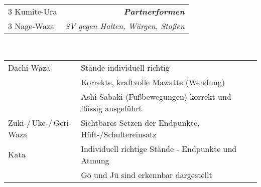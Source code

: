 \begin{tcolorbox}[colframe=BLBELT,colback=white,coltitle=white,title=4. Kyu:\indent Kihon-Ido Kata - Partnerformen - Erwartungshorizont]
\begin{minipage}[t]{0.45\textwidth}
\begin{tabularx}{\textwidth}{cX}
			\midrule
		\end{tabularx}
	\end{minipage}
	\null\hfill\null	%
	\begin{minipage}[t]{0.45\textwidth}
		\begin{tabularx}{\textwidth}{Xr}
			\midrule
			3 Kumite-Ura	&{\textbf{\textit{Partnerformen}}}\\
			3 Nage-Waza		&{\small \textit{SV gegen Halten, Würgen, Stoßen}} \\
			\midrule
		\end{tabularx}
	\end{minipage}\\
	\null\vfill\null
	{\small\begin{tabularx}{\textwidth}{ll}
		\midrule
			Dachi-Waza	&	Stände individuell richtig \\
			&	Korrekte, kraftvolle Mawatte (Wendung)\\
			&	Ashi-Sabaki (Fußbewegungen) korrekt und flüssig ausgeführt\\
			Zuki-/\,Uke-/\,Geri-Waza	&	Sichtbares Setzen der Endpunkte, Hüft-/Schultereinsatz\\
			Kata		&	Individuell richtige Stände - Endpunkte und Atmung\\
			&	G\={o} und J\={u} sind erkennbar dargestellt\\
		\midrule
	\end{tabularx}}\null\vfill\null
\end{tcolorbox}	